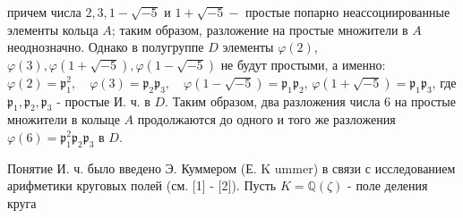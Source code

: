 \documentclass[10pt]{article}
\begin{document}
причем числа $2,3,1-\sqrt{-5}$ и $1+\sqrt{-5}-$ простые попарно неассоциированные элементы кольца $A$; таким образом, разложение на простые множители в $A$ неоднозначно. Однако в полугруппе $D$ элементы $\varphi(2)$, $\varphi(3), \varphi(1+\sqrt{-5}), \varphi(1-\sqrt{-5})$ не будут простыми, а именно: $\varphi(2)=\mathfrak{p}_{1}^{2}, \quad \varphi(3)=\mathfrak{p}_{2} \mathfrak{p}_{3}, \quad \varphi(1-\sqrt{-5})=\mathfrak{p}_{1} \mathfrak{p}_{2}$, $\varphi(1+\sqrt{-5})=\mathfrak{p}_{1} \mathfrak{p}_{3}$, где $\mathfrak{p}_{1}, \mathfrak{p}_{2}, \mathfrak{p}_{3}$ - простые И. ч. в $D$. Таким образом, два разложения числа 6 на простые множители в колыце $A$ продолжаются до одного и того же разложения $\varphi(6)=\mathfrak{p}_{1}^{2} \mathfrak{p}_{2} \mathfrak{p}_{3}$ в $D$.



Понятие И. ч. было введено Э. Куммером (Е. K ummer) в связи с исследованием арифметики круговых полей (см. [1] - [2]). Пусть $K=\mathbb{Q}(\zeta)$ - поле деления круга
\end{document}
